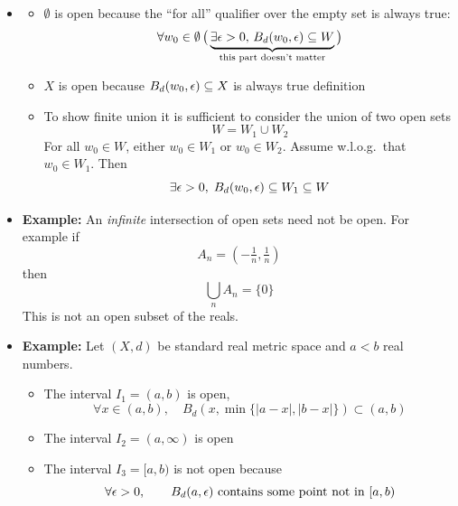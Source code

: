 \documentclass[11pt,twoside]{report}
\begin{document}
\begin{itemize}
\item {}

\begin{itemize}

\item  $\emptyset$ is open because the ``for all'' qualifier over the empty set is always true: 
\[
\forall w_0 \in \emptyset\,  \big( \underbrace{ \exists  \epsilon > 0, \,  B_d (w_0,\epsilon) \subseteq W }_\text{this part doesn't matter}  \big) 
\] 

\item $X$ is open because $B_d(w_0, \epsilon) \subseteq X$ is always true definition

\item To show finite union it is sufficient to consider the union of two open sets
\[
W = W_1 \cup W_2
\]
For all $w_0 \in W$, either $w_0 \in W_1$ or $w_0 \in W_2$.  Assume w.l.o.g.\ that $w_0 \in W_1$. Then 
\[
\exists \epsilon > 0, \; B_d(w_0,\epsilon) \subseteq W_1 \subseteq W
\]
\end{itemize}


\item \textbf{Example:} An \emph{infinite} intersection of open sets need not be open. For example if 
\[
A_n = (-\tfrac{1}{n} , \tfrac{1}{n})
\]
then
\[
\bigcup_{n} A_n = \{ 0\} 
\]
This is not an open subset of the reals. 


\item \textbf{Example:} Let $(X, d)$ be standard real metric space and $a < b$ real numbers. 
\begin{itemize}
\item The interval $I_1 = (a, b)$ is open, 
\[
\forall x \in (a, b) ,  \quad B_d(x, \min\{ |a-x|, |b-x| \}  ) \subset (a,b) 
\]

\item The interval $I_2 = (a, \infty)$ is open

\item The interval $I_3 = [a, b)$ is not open because 
\[
\forall \epsilon >0, \qquad B_d(a,\epsilon)  \text{  contains some point not in $[a,b)$} 
\]

\end{itemize}



\end{itemize}
\end{document}
